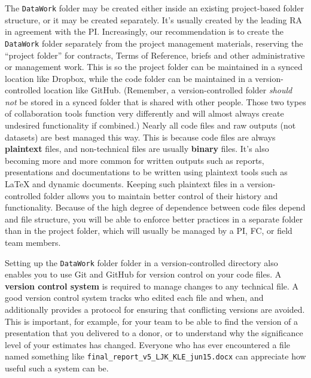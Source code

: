 The \texttt{DataWork} folder may be created either inside
an existing project-based folder structure, or it may be created separately.
It's usually created by the leading RA in agreement with the PI.
Increasingly, our recommendation is to create the \texttt{DataWork} folder
separately from the project management materials,
reserving the ``project folder'' for contracts, Terms of Reference, briefs and other administrative or management work.
This is so the project folder can be maintained in a synced location like Dropbox,
while the code folder can be maintained in a version-controlled location like GitHub.
(Remember, a version-controlled folder \textit{should not}
be stored in a synced folder that is shared with other people.
Those two types of collaboration tools function very differently
and will almost always create undesired functionality if combined.)
Nearly all code files and raw outputs (not datasets) are best managed this way.
This is because code files are always \textbf{plaintext} files,
and non-technical files are usually \textbf{binary} files.
It's also becoming more and more common for written outputs such as reports,
presentations and documentations to be written using plaintext
tools such as {\LaTeX} and dynamic documents.\index{{\LaTeX}}
Keeping such plaintext files in a version-controlled folder allows you
to maintain better control of their history and functionality.
Because of the high degree of dependence between code files depend and file structure,
you will be able to enforce better practices in a separate folder than in the project folder,
which will usually be managed by a PI, FC, or field team members.

Setting up the \texttt{DataWork} folder folder in a version-controlled directory
also enables you to use Git and GitHub for version control on your code files.
A \textbf{version control system} is required to manage changes to any technical file.
A good version control system tracks who edited each file and when,
and additionally provides a protocol for ensuring that conflicting versions are avoided.
This is important, for example, for your team
to be able to find the version of a presentation that you delivered to a donor,
or to understand why the significance level of your estimates has changed.
Everyone who has ever encountered a file named something like \texttt{final\_report\_v5\_LJK\_KLE\_jun15.docx}
can appreciate how useful such a system can be.


